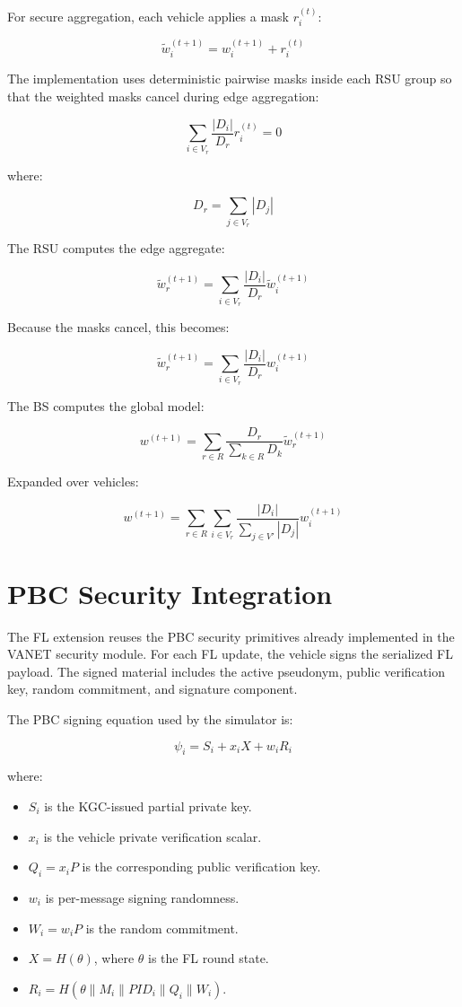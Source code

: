 \documentclass[11pt,a4paper]{article}
\begin{document}
For secure aggregation, each vehicle applies a mask \(r_i^{(t)}\):

\[
\widetilde{w}_i^{(t+1)} = w_i^{(t+1)} + r_i^{(t)}
\]

The implementation uses deterministic pairwise masks inside each RSU group so
that the weighted masks cancel during edge aggregation:

\[
\sum_{i\in V_r}\frac{|D_i|}{D_r}r_i^{(t)} = 0
\]

where:

\[
D_r = \sum_{j\in V_r}|D_j|
\]

The RSU computes the edge aggregate:

\[
\widetilde{w}_r^{(t+1)}=
\sum_{i\in V_r}\frac{|D_i|}{D_r}\widetilde{w}_i^{(t+1)}
\]

Because the masks cancel, this becomes:

\[
\widetilde{w}_r^{(t+1)}=
\sum_{i\in V_r}\frac{|D_i|}{D_r}w_i^{(t+1)}
\]

The BS computes the global model:

\[
w^{(t+1)}=\sum_{r\in R}\frac{D_r}{\sum_{k\in R}D_k}\widetilde{w}_r^{(t+1)}
\]

Expanded over vehicles:

\[
w^{(t+1)}=\sum_{r\in R}\sum_{i\in V_r}
\frac{|D_i|}{\sum_{j\in V'}|D_j|}w_i^{(t+1)}
\]

\section{PBC Security Integration}

The FL extension reuses the PBC security primitives already implemented in the
VANET security module. For each FL update, the vehicle signs the serialized FL
payload. The signed material includes the active pseudonym, public verification
key, random commitment, and signature component.

The PBC signing equation used by the simulator is:

\[
\psi_i = S_i + x_iX + w_iR_i
\]

where:

\begin{itemize}[leftmargin=*]
  \item \(S_i\) is the KGC-issued partial private key.
  \item \(x_i\) is the vehicle private verification scalar.
  \item \(Q_i=x_iP\) is the corresponding public verification key.
  \item \(w_i\) is per-message signing randomness.
  \item \(W_i=w_iP\) is the random commitment.
  \item \(X=H(\theta)\), where \(\theta\) is the FL round state.
  \item \(R_i=H(\theta\parallel M_i\parallel PID_i\parallel Q_i\parallel W_i)\).
\end{itemize}
\end{document}

